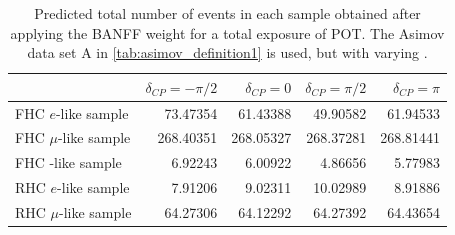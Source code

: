 \begin{table}[H]
\center
\begin{tabular} { | l ||r | r | r | r | }
	\hline
	&	$\delta_{CP}=-\pi/2$	&	$\delta_{CP}=0$	&	$\delta_{CP}=\pi/2$	&	$\delta_{CP}=\pi$	\\ \hline\hline
	FHC $e$-like sample				& 73.47354  & 61.43388  & 49.90582  & 61.94533  \\ \hline
	FHC $\mu$-like sample			& 268.40351 & 268.05327 & 268.37281 & 268.81441 \\ \hline
	FHC \nueCConepi{}-like sample	& 6.92243   & 6.00922   & 4.86656   & 5.77983   \\ \hline
	RHC $e$-like sample				& 7.91206   & 9.02311   & 10.02989  & 8.91886   \\ \hline
	RHC $\mu$-like sample			& 64.27306  & 64.12292  & 64.27392  & 64.43654  \\ \hline	
\end{tabular}
\caption{
Predicted total number of events in each sample obtained after applying the BANFF weight for a total exposure of \TotalPotNu{} POT. The Asimov data set A in \ref{tab:asimov_definition1} is used, but with varying \deltacp.
}
\label{tab:events_asimov_a_dcp_var_1re}
\end{table}
